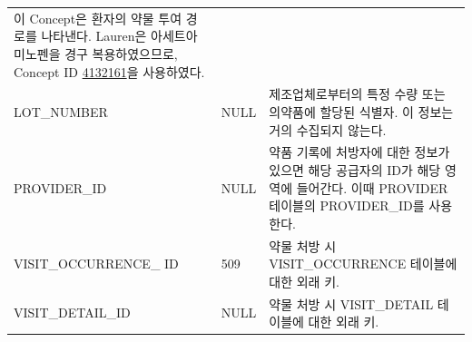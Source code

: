 \documentclass[11pt]{book}
\theoremstyle{definition}
\theoremstyle{definition}
\theoremstyle{definition}
\theoremstyle{remark}
\begin{document}
\begin{longtable}[]{@{}lll@{}}
\begin{minipage}[t]{0.48\columnwidth}
이 Concept은 환자의 약물 투여 경로를 나타낸다. Lauren은 아세트아미노펜을
경구 복용하였으므로, Concept ID
\href{http://athena.ohdsi.org/search-terms/terms/4132161}{4132161}을
사용하였다.\strut
\end{minipage}\tabularnewline
\begin{minipage}[t]{0.28\columnwidth}\raggedright\strut
LOT\_NUMBER\strut
\end{minipage} & \begin{minipage}[t]{0.16\columnwidth}\raggedright\strut
NULL\strut
\end{minipage} & \begin{minipage}[t]{0.48\columnwidth}\raggedright\strut
제조업체로부터의 특정 수량 또는 의약품에 할당된 식별자. 이 정보는 거의
수집되지 않는다.\strut
\end{minipage}\tabularnewline
\begin{minipage}[t]{0.28\columnwidth}\raggedright\strut
PROVIDER\_ID\strut
\end{minipage} & \begin{minipage}[t]{0.16\columnwidth}\raggedright\strut
NULL\strut
\end{minipage} & \begin{minipage}[t]{0.48\columnwidth}\raggedright\strut
약품 기록에 처방자에 대한 정보가 있으면 해당 공급자의 ID가 해당 영역에
들어간다. 이때 PROVIDER 테이블의 PROVIDER\_ID를 사용한다.\strut
\end{minipage}\tabularnewline
\begin{minipage}[t]{0.28\columnwidth}\raggedright\strut
VISIT\_OCCURRENCE\_ ID\strut
\end{minipage} & \begin{minipage}[t]{0.16\columnwidth}\raggedright\strut
509\strut
\end{minipage} & \begin{minipage}[t]{0.48\columnwidth}\raggedright\strut
약물 처방 시 VISIT\_OCCURRENCE 테이블에 대한 외래 키.\strut
\end{minipage}\tabularnewline
\begin{minipage}[t]{0.28\columnwidth}\raggedright\strut
VISIT\_DETAIL\_ID\strut
\end{minipage} & \begin{minipage}[t]{0.16\columnwidth}\raggedright\strut
NULL\strut
\end{minipage} & \begin{minipage}[t]{0.48\columnwidth}\raggedright\strut
약물 처방 시 VISIT\_DETAIL 테이블에 대한 외래 키.\strut
\end{minipage}\tabularnewline

\end{longtable}
\end{document}

